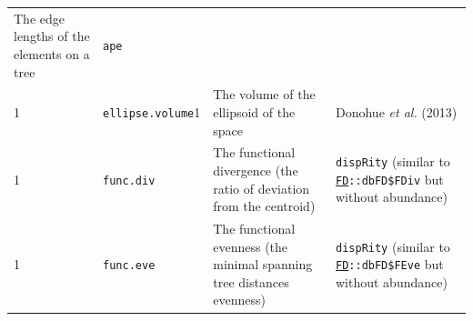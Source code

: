 \documentclass[
]{book}
\begin{document}
\begin{longtable}[]{@{}llll@{}}
\begin{minipage}[t]{0.64\columnwidth}
The edge lengths of the elements on a tree\strut
\end{minipage} & \begin{minipage}[t]{0.10\columnwidth}\raggedright
\texttt{ape}\strut
\end{minipage}\tabularnewline
\begin{minipage}[t]{0.07\columnwidth}\raggedright
1\strut
\end{minipage} & \begin{minipage}[t]{0.07\columnwidth}\raggedright
\texttt{ellipse.volume}1\strut
\end{minipage} & \begin{minipage}[t]{0.64\columnwidth}\raggedright
The volume of the ellipsoid of the space\strut
\end{minipage} & \begin{minipage}[t]{0.10\columnwidth}\raggedright
Donohue \emph{et al.} (2013)\strut
\end{minipage}\tabularnewline
\begin{minipage}[t]{0.07\columnwidth}\raggedright
1\strut
\end{minipage} & \begin{minipage}[t]{0.07\columnwidth}\raggedright
\texttt{func.div}\strut
\end{minipage} & \begin{minipage}[t]{0.64\columnwidth}\raggedright
The functional divergence (the ratio of deviation from the centroid)\strut
\end{minipage} & \begin{minipage}[t]{0.10\columnwidth}\raggedright
\texttt{dispRity} (similar to \href{https://cran.r-project.org/web/packages/FD/index.html}{\texttt{FD}}\texttt{::dbFD\$FDiv} but without abundance)\strut
\end{minipage}\tabularnewline
\begin{minipage}[t]{0.07\columnwidth}\raggedright
1\strut
\end{minipage} & \begin{minipage}[t]{0.07\columnwidth}\raggedright
\texttt{func.eve}\strut
\end{minipage} & \begin{minipage}[t]{0.64\columnwidth}\raggedright
The functional evenness (the minimal spanning tree distances evenness)\strut
\end{minipage} & \begin{minipage}[t]{0.10\columnwidth}\raggedright
\texttt{dispRity} (similar to \href{https://cran.r-project.org/web/packages/FD/index.html}{\texttt{FD}}\texttt{::dbFD\$FEve} but without abundance)\strut

\end{minipage}
\end{longtable}
\end{document}
